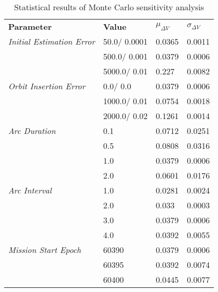 
                    \begin{table}[]
                    \centering
                    \begin{tabular}{l l l l}
                    \rowcolor[HTML]{EFEFEF} \textbf{Parameter} & \textbf{Value} & \textbf{$\mu_{\Delta V}$} & \textbf{$\sigma_{\Delta V}$} \\
                    \textit{Initial Estimation Error} & 50.0/
0.0001 & 0.0365 & 0.0011 \\
 & 500.0/
0.001 & 0.0379 & 0.0006 \\
 & 5000.0/
0.01 & 0.227 & 0.0082 \\
\textit{Orbit Insertion Error} & 0.0/
0.0 & 0.0379 & 0.0006 \\
 & 1000.0/
0.01 & 0.0754 & 0.0018 \\
 & 2000.0/
0.02 & 0.1261 & 0.0014 \\
\textit{Arc Duration} & 0.1 & 0.0712 & 0.0251 \\
 & 0.5 & 0.0808 & 0.0316 \\
 & 1.0 & 0.0379 & 0.0006 \\
 & 2.0 & 0.0601 & 0.0176 \\
\textit{Arc Interval} & 1.0 & 0.0281 & 0.0024 \\
 & 2.0 & 0.033 & 0.0003 \\
 & 3.0 & 0.0379 & 0.0006 \\
 & 4.0 & 0.0392 & 0.0055 \\
\textit{Mission Start Epoch} & 60390 & 0.0379 & 0.0006 \\
 & 60395 & 0.0392 & 0.0074 \\
 & 60400 & 0.0445 & 0.0077 \\

                    \end{tabular}
                    \caption{Statistical results of Monte Carlo sensitivity analysis}
                    \label{tab:SensitivityAnalysis}
                    \end{table}
                    